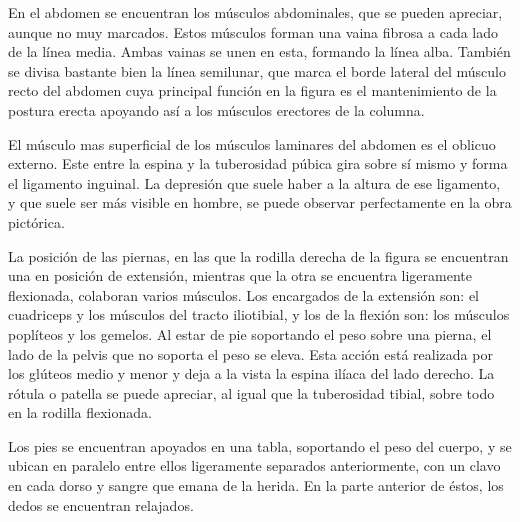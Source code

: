 En el abdomen se encuentran los músculos abdominales, que se pueden apreciar, aunque no muy marcados. Estos músculos forman una vaina fibrosa a cada lado de la línea media. Ambas vainas se unen en esta, formando la línea alba. También se divisa bastante bien la línea semilunar, que marca el borde lateral del músculo recto del abdomen cuya principal función en la figura es el mantenimiento de la postura erecta apoyando así a los músculos erectores de la columna.

El músculo mas superficial de los músculos laminares del abdomen es el oblicuo externo. Este entre la espina y la tuberosidad púbica gira sobre sí mismo y forma el ligamento inguinal. La depresión que suele haber a la altura de ese ligamento, y que suele ser más visible en hombre, se puede observar perfectamente en la obra pictórica.

La posición de las piernas, en las que la rodilla derecha de la figura se encuentran una en posición de extensión, mientras que la otra se encuentra ligeramente flexionada, colaboran varios músculos. Los encargados de la extensión son: el cuadriceps y los músculos del tracto iliotibial, y los de la flexión son: los músculos poplíteos y los gemelos. Al estar de pie soportando el peso sobre una pierna, el lado de la pelvis que no soporta el peso se eleva. Esta acción está realizada por los glúteos medio y menor y deja a la vista la espina ilíaca del lado derecho.
La rótula o patella se puede apreciar, al igual que la tuberosidad tibial, sobre todo en la rodilla flexionada.

Los pies se encuentran apoyados en una tabla, soportando el peso del cuerpo, y se ubican en paralelo entre ellos ligeramente separados anteriormente, con un clavo en cada dorso y sangre que emana de la herida. En la parte anterior de éstos, los dedos se encuentran relajados.



